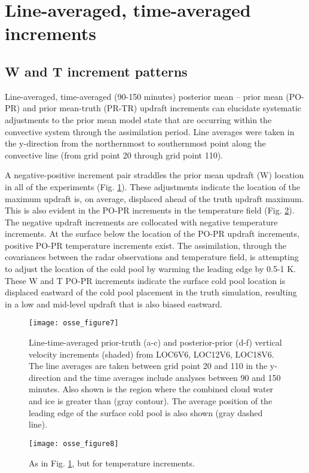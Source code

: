 \section{Line-averaged, time-averaged increments}
\subsection{W and T increment patterns}
Line-averaged, time-averaged (90-150 minutes) posterior mean – prior mean (PO-PR) and prior mean-truth (PR-TR) updraft increments can elucidate systematic adjustments to the prior mean model state that are occurring within the convective system through the assimilation period. Line averages were taken in the y-direction from the northernmost to southernmost point along the convective line (from grid point 20 through grid point 110).

A negative-positive increment pair straddles the prior mean updraft (W) location in all of the experiments (Fig. \ref{osse_fig7}). These adjustments indicate the location of the maximum updraft is, on average, displaced ahead of the truth updraft maximum. This is also evident in the PO-PR increments in the temperature field (Fig. \ref{osse_fig8}). The negative updraft increments are collocated with negative temperature increments. At the surface below the location of the PO-PR updraft increments, positive PO-PR temperature increments exist. The assimilation, through the covariances between the radar observations and temperature field, is attempting to adjust the location of the cold pool by warming the leading edge by 0.5-1 K. These W and T PO-PR increments indicate the surface cold pool location is displaced eastward of the cold pool placement in the truth simulation, resulting in a low and mid-level updraft that is also biased eastward.

\begin{figure}
\centering
\texttt{[image: osse\_figure7]}
\caption{Line-time-averaged prior-truth (a-c) and posterior-prior (d-f) vertical velocity increments (shaded) from LOC6V6, LOC12V6, LOC18V6. The line averages are taken between grid point 20 and 110 in the y-direction and the time averages include analyses between 90 and 150 minutes. Also shown is the region where the combined cloud water and ice is greater than (gray contour). The average position of the leading edge of the surface cold pool is also shown (gray dashed line). }
\label{osse_fig7}
\end{figure}

\begin{figure}
\centering
\texttt{[image: osse\_figure8]}
\caption{As in Fig. \ref{osse_fig7}, but for temperature increments.}
\label{osse_fig8}
\end{figure}

